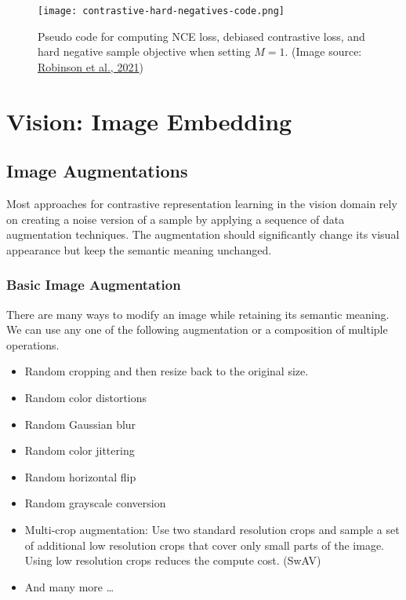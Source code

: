 \documentclass[12pt]{article}
\begin{document}
\begin{figure}[H]
    \centering
    \texttt{[image: contrastive-hard-negatives-code.png]}
    \caption{Pseudo code for computing NCE loss, debiased contrastive loss, and hard negative sample objective when setting $M=1$. (Image source: \href{https://arxiv.org/abs/2010.04592}{Robinson et al., 2021})}
\end{figure}

\section{Vision: Image Embedding}

\subsection{Image Augmentations}

Most approaches for contrastive representation learning in the vision domain rely on creating a noise version of a sample by applying a sequence of data augmentation techniques. The augmentation should significantly change its visual appearance but keep the semantic meaning unchanged.

\subsubsection{Basic Image Augmentation}

There are many ways to modify an image while retaining its semantic meaning. We can use any one of the following augmentation or a composition of multiple operations.
\begin{itemize}
    \item Random cropping and then resize back to the original size.
    \item Random color distortions
    \item Random Gaussian blur
    \item Random color jittering
    \item Random horizontal flip
    \item Random grayscale conversion
    \item Multi-crop augmentation: Use two standard resolution crops and sample a set of additional low resolution crops that cover only small parts of the image. Using low resolution crops reduces the compute cost. (SwAV)
    \item And many more \ldots
\end{itemize}
\end{document}
